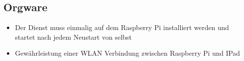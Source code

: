 \vspace{1,5cm}

\subsection{Orgware}

\begin{itemize}
  \item Der Dienst muss einmalig auf dem Raspberry Pi installiert werden und startet nach jedem Neustart von selbst
  \item Gewährleistung einer WLAN Verbindung zwischen Raspberry Pi und IPad
\end{itemize}

